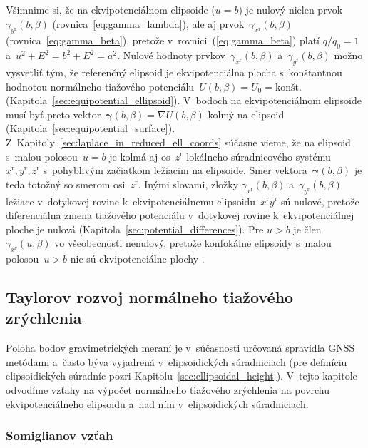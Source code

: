 \documentclass[a4paper, 12pt]{book}
\begin{document}
Všimnime si, že na ekvipotenciálnom elipsoide ($u = b$) je nulový nielen 
prvok~$\gamma_{y^\mathrm{r}}(b, \beta)$ (rovnica~\ref{eq:gamma_lambda}), ale aj 
prvok~$\gamma_{x^\mathrm{r}}(b, \beta)$ (rovnica~\ref{eq:gamma_beta}), pretože 
v~rovnici~(\ref{eq:gamma_beta}) platí $q \slash q_0 = 1$ a~$u^2 + E^2 = b^2 
+ E^2 = a^2$.  Nulové hodnoty prvkov~$\gamma_{x^\mathrm{r}}(b, \beta)$ 
a~$\gamma_{y^\mathrm{r}}(b, \beta)$ možno vysvetliť tým, že referenčný elipsoid 
je ekvipotenciálna plocha s~konštantnou hodnotou normálneho tiažového 
potenciálu~$U(b, \beta) = U_0 = \textrm{kon\v{s}t.}$
(Kapitola~\ref{sec:equipotential_ellipsoid}).  V~bodoch na ekvipotenciálnom 
elipsoide musí byť preto vektor~$\boldsymbol \gamma(b, \beta) = \nabla U(b, 
\beta)$ kolmý na elipsoid (Kapitola~\ref{sec:equipotential_surface}).  
Z~Kapitoly~\ref{sec:laplace_in_reduced_ell_coords} súčasne vieme, že na 
elipsoid s~malou polosou~$u = b$ je kolmá aj os~$z^\mathrm{r}$ lokálneho 
súradnicového systému~$x^\mathrm{r}, y^\mathrm{r}, z^\mathrm{r}$ s~pohyblivým 
začiatkom ležiacim na elipsoide.  Smer vektora~$\boldsymbol \gamma(b, \beta)$ 
je teda totožný so smerom osi~$z^\mathrm{r}$.  Inými slovami, zložky 
$\gamma_{x^\mathrm{r}}(b, \beta)$ a~$\gamma_{y^\mathrm{r}}(b, \beta)$ ležiace 
v~dotykovej rovine k~ekvipotenciálnemu elipsoidu~$x^\mathrm{r} y^\mathrm{r}$ sú 
nulové, pretože diferenciálna zmena tiažového potenciálu v~dotykovej rovine 
k~ekvipotenciálnej ploche je nulová (Kapitola~\ref{sec:potential_differences}).  
Pre $u > b$ je člen $\gamma_{x^\mathrm{r}}(u, \beta)$ vo všeobecnosti nenulový, 
pretože konfokálne elipsoidy s~malou polosou~$u > b$ nie sú ekvipotenciálne 
plochy \parencite{MoritzPhysicalGeodesy}.



\subsection{Taylorov rozvoj normálneho tiažového zrýchlenia}
\label{sec:normal_gravity_taylor}

Poloha bodov gravimetrických meraní je v~súčasnosti určovaná spravidla GNSS 
metódami a~často býva vyjadrená v~elipsoidických súradniciach (pre definíciu 
elipsoidických súradníc pozri Kapitolu~\ref{sec:ellipsoidal_height}).  V~tejto 
kapitole odvodíme vzťahy na výpočet normálneho tiažového zrýchlenia na povrchu 
ekvipotenciálneho elipsoidu a~nad ním v~elipsoidických súradniciach.

\subsubsection{Somiglianov vzťah}
\label{sec:somigliana}
\end{document}
